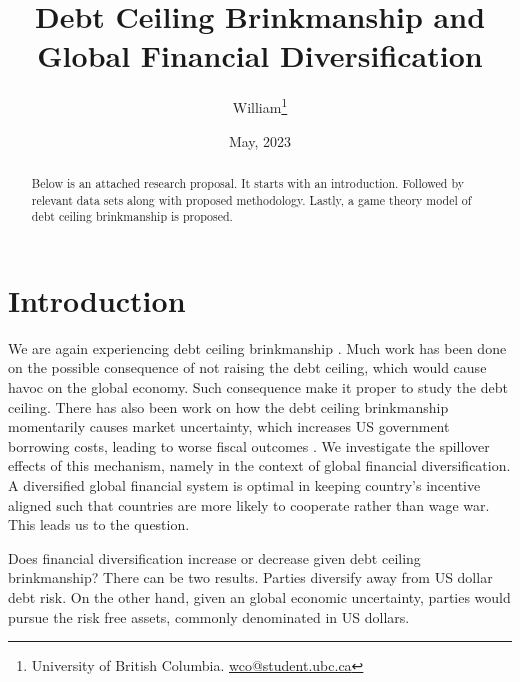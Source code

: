 \documentclass[12pt]{article}
\title{ \vspace*{-2.5cm} \hspace*{-0.5cm}Debt Ceiling Brinkmanship and Global Financial Diversification}
\author{William\thanks{University of British Columbia.
\href{mailto:TK@TK.edu}{wco@student.ubc.ca}}}
\date{ \vspace*{0.5cm} May, 2023\\
}
\begin{document}
\bgroup
\let\footnoterule\relax

\begin{singlespace}
\maketitle


\begin{abstract}
    \noindent Below is an attached research proposal. It starts with an introduction. Followed by relevant data sets along with proposed methodology. Lastly, a game theory model of debt ceiling brinkmanship is proposed. 
\end{abstract}
\end{singlespace}
\thispagestyle{empty}

\clearpage
\egroup
\setcounter{page}{1}


\section{Introduction 
\label{sec:Introduction}}
We are again experiencing debt ceiling brinkmanship \citep{CFR}. Much work has been done on the possible consequence of not raising the debt ceiling, which would cause havoc on the global economy. Such consequence make it proper to study the debt ceiling. There has also been work on how the debt ceiling brinkmanship momentarily causes market uncertainty, which increases US government borrowing costs, leading to worse fiscal outcomes \citep{Kent_Clark_Center}. We investigate the spillover effects of this mechanism, namely in the context of global financial diversification. A diversified global financial system is optimal in keeping country's incentive aligned such that countries are more likely to cooperate rather than wage war. This leads us to the question.

Does financial diversification increase or decrease given debt ceiling brinkmanship? There can be two results. Parties diversify away from US dollar debt risk. On the other hand, given an global economic uncertainty, parties would pursue the risk free assets, commonly denominated in US dollars. 
\end{document}
